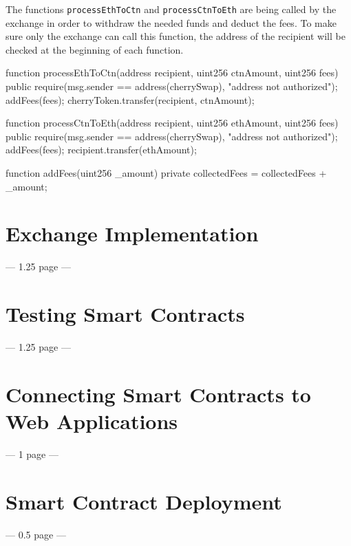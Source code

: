 The functions \texttt{processEthToCtn} and \texttt{processCtnToEth} are being called by the exchange in order to withdraw the needed funds and deduct the fees. To make sure only the exchange can call this function, the address of the recipient will be checked at the beginning of each function.
\begin{GenericCode}
function processEthToCtn(address recipient, uint256 ctnAmount, uint256 fees) public  {
  require(msg.sender == address(cherrySwap), "address not authorized");
  addFees(fees);
  cherryToken.transfer(recipient, ctnAmount);
}

function processCtnToEth(address recipient, uint256 ethAmount, uint256 fees) public {
  require(msg.sender == address(cherrySwap), "address not authorized");
  addFees(fees);
  recipient.transfer(ethAmount);
}

function addFees(uint256 _amount) private {
  collectedFees = collectedFees + _amount;
}	
\end{GenericCode}

\section{Exchange Implementation}
--- 1.25 page ---

\section{Testing Smart Contracts}
--- 1.25 page ---

\section{Connecting Smart Contracts to Web Applications}
--- 1 page ---

\section{Smart Contract Deployment}
--- 0.5 page ---
